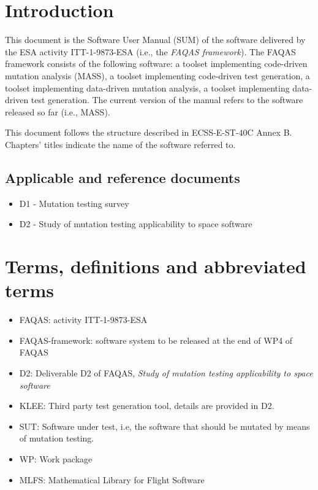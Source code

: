 
\chapter{Introduction}

This document is the Software User Manual (SUM) of the software delivered by the ESA activity ITT-1-9873-ESA (i.e., the \emph{FAQAS framework}).
The FAQAS framework consists of the following software: a toolset  implementing code-driven mutation analysis (MASS), a toolset implementing code-driven test generation, a toolset implementing data-driven mutation analysis, a toolset implementing data-driven test generation. The current version of the manual refers to the software released so far (i.e., MASS).

This document follows the structure described in ECSS-E-ST-40C Annex B. Chapters' titles indicate the name of the software referred to.
 
 
 
\section{Applicable and reference documents}

\begin{itemize}
\item{D1 - Mutation testing survey}
\item{D2 - Study of mutation testing applicability to space software}
\end{itemize}

\chapter{Terms, definitions and abbreviated terms}

\begin{itemize}
\item{FAQAS}: activity ITT-1-9873-ESA
\item{FAQAS-framework}: software system to be released at the end of WP4 of FAQAS
\item{D2}: Deliverable D2 of FAQAS, \emph{Study of mutation testing applicability to space software}
\item{KLEE}: Third party test generation tool, details are provided in D2.
\item{SUT}: Software under test, i.e, the software that should be mutated by means of mutation testing.
\item{WP}: Work package
\item{MLFS}: Mathematical Library for Flight Software
\end{itemize}

\clearpage
 

